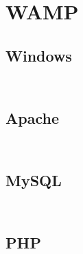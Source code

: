 \begin{lstlisting}[language=bash]

\end{lstlisting}


\chapter{WAMP}



\section{Windows}


\begin{lstlisting}[language=bash]

\end{lstlisting}




\begin{lstlisting}[language=bash]

\end{lstlisting}



\section{Apache}


\begin{lstlisting}[language=bash]

\end{lstlisting}



\begin{lstlisting}[language=bash]

\end{lstlisting}


\section{MySQL}


\begin{lstlisting}[language=bash]

\end{lstlisting}




\begin{lstlisting}[language=bash]

\end{lstlisting}


\section{PHP}


